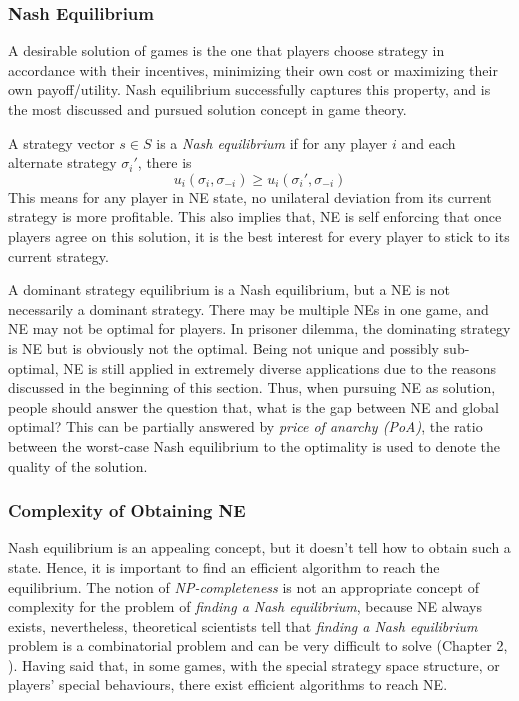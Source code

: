 \subsubsection{Nash Equilibrium}
A desirable solution of games is the one that players choose strategy in accordance with their incentives, minimizing their own cost or maximizing their own payoff/utility.
Nash equilibrium successfully captures this property, and is the most discussed and pursued solution concept in game theory.

A strategy vector $s\in S$ is a \textit{Nash equilibrium} if for any player $i$ and each alternate strategy $\sigma_i'$, there is
 \[ u_i(\sigma_i, \sigma_{-i}) \geq u_i(\sigma_i', \sigma_{-i})\]
This means for any player in NE state, no unilateral deviation from its current strategy is more profitable.
This also implies that, NE is self enforcing that once players agree on this solution, it is the best interest for every player to stick to its current strategy.

A dominant strategy equilibrium is a Nash equilibrium, but a NE is not necessarily a dominant strategy.
There may be multiple NEs in one game, and NE may not be optimal for players. 
In prisoner dilemma, the dominating strategy is NE but is obviously not the optimal.
%
Being not unique and possibly sub-optimal, NE is still applied in extremely diverse applications due to the reasons discussed in the beginning of this section.
Thus, when pursuing NE as solution, people should answer the question that, what is the gap between NE and global optimal?
This can be partially answered by \textit{price of anarchy (\gls{PoA})}, the ratio between the worst-case Nash equilibrium to the optimality is used to denote the quality of the solution.

\subsubsection{Complexity of Obtaining NE}
Nash equilibrium is an appealing concept, but it doesn't tell how to obtain such a state.
Hence, it is important to find an efficient algorithm to reach the equilibrium.
The notion of \textit{NP-completeness} is not an appropriate concept of complexity for the problem of \textit{finding a Nash equilibrium}, because NE always exists, nevertheless, theoretical scientists tell that \textit{finding a Nash equilibrium} problem is a combinatorial problem and can be very difficult to solve (Chapter 2, \cite{agt_book}).
Having said that, in some games, with the special strategy space structure, or players' special behaviours, there exist efficient algorithms to reach NE.






